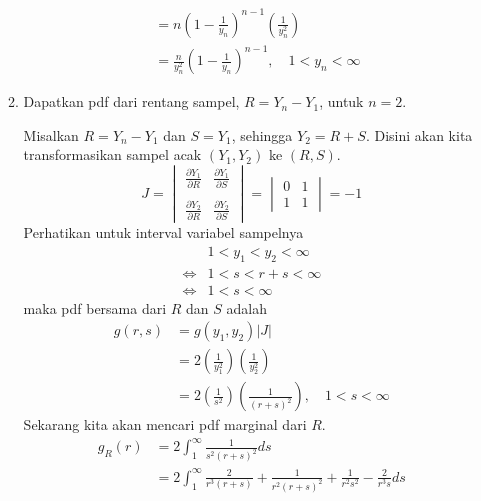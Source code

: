 \documentclass{exam}
\newcommand{\del}{\partial}
\begin{document}
\begin{enumerate}
\begin{enumerate}
\begin{solution}
\begin{align*}
                    &= n\left(1-\frac{1}{y_n}\right)^{n-1}\left(\frac{1}{y_n^2}\right)\\
                    &= \frac{n}{y_n^2}\left(1-\frac{1}{y_n}\right)^{n-1},\quad 1<y_n<\infty
                \end{align*}
            \end{solution}
            \item Dapatkan pdf dari rentang sampel, $R=Y_n-Y_1$, untuk $n=2$.
            \begin{solution}
                Misalkan $R=Y_n-Y_1$ dan $S=Y_1$, sehingga $Y_2=R+S$. Disini akan kita transformasikan sampel acak $(Y_1,Y_2)$ ke $(R,S)$.
                \[J=\begin{vmatrix}
                    \displaystyle\frac{\del Y_1}{\del R} & \displaystyle\frac{\del Y_1}{\del S}\\\\
                    \displaystyle\frac{\del Y_2}{\del R} & \displaystyle\frac{\del Y_2}{\del S}
                \end{vmatrix}=\begin{vmatrix}
                    0 & 1\\
                    1 & 1
                \end{vmatrix}=-1\] 
                Perhatikan untuk interval variabel sampelnya
                \begin{align*}
                    &1<y_1<y_2<\infty\\
                    \iff& 1<s<r+s<\infty\\
                    \iff& 1<s<\infty
                \end{align*}
                maka pdf bersama dari $R$ dan $S$ adalah
                \begin{align*}
                    g(r,s) &= g(y_1,y_2)|J|\\
                    &= 2\left(\frac{1}{y_1^2}\right)\left(\frac{1}{y_2^2}\right)\\
                    &= 2\left(\frac{1}{s^2}\right)\left(\frac{1}{(r+s)^2}\right),\quad 1<s<\infty
                \end{align*}
                Sekarang kita akan mencari pdf marginal dari $R$.
                \begin{align*}
                    g_R(r) &= 2\int_{1}^{\infty}\frac{1}{s^2(r+s)^2}ds\\
                    &= 2\int_{1}^{\infty} \frac{2}{r^3(r+s)}+\frac{1}{r^2(r+s)^2}+\frac{1}{r^2s^2}-\frac{2}{r^3s}ds\\

\end{align*}
\end{solution}
\end{enumerate}
\end{enumerate}
\end{document}
